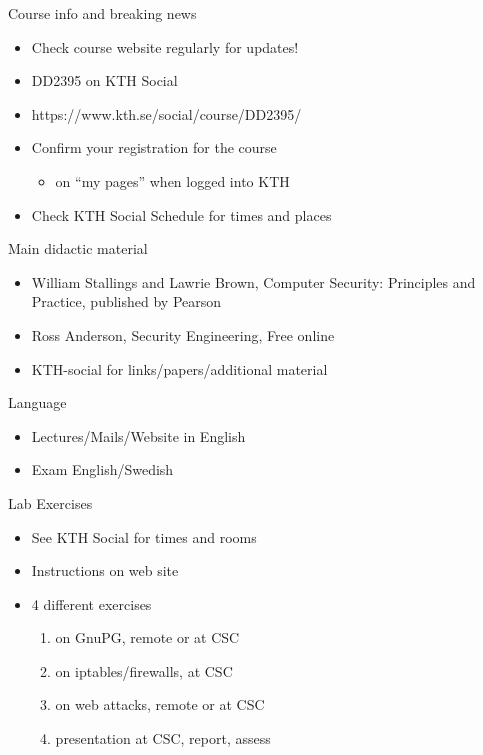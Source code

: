 \documentclass{beamer}
\begin{document}
\begin{frame}{Course info and breaking news}
  \begin{itemize}
    \item Check course website regularly for updates!
    \item DD2395 on KTH Social
    \item https://www.kth.se/social/course/DD2395/
    \item \alert{Confirm your registration for the course}
      \begin{itemize}
        \item on ``my pages'' when logged into KTH
      \end{itemize}
    \item Check KTH Social Schedule for times and places
  \end{itemize}
\end{frame}


\begin{frame}{Main didactic material}
  \begin{itemize}
  \item William Stallings and Lawrie Brown, Computer Security:
    Principles and Practice, published by Pearson 
  \item Ross Anderson, Security Engineering, Free online
  \item KTH-social for links/papers/additional material
  \end{itemize}
\end{frame}

\begin{frame}{Language}
  \begin{itemize}
  \item Lectures/Mails/Website in English
  \item Exam English/Swedish
  \end{itemize}
\end{frame}

\begin{frame}{Lab Exercises}
  \begin{itemize}
    \item See KTH Social for times and rooms
    \item Instructions on web site
    \item 4 different exercises
      \begin{enumerate}
        \item on GnuPG, remote or at CSC
        \item on iptables/firewalls, at CSC
        \item on web attacks, remote or at CSC
        \item presentation at CSC, report, assess
      \end{enumerate}
  \end{itemize}
\end{frame}
\end{document}
